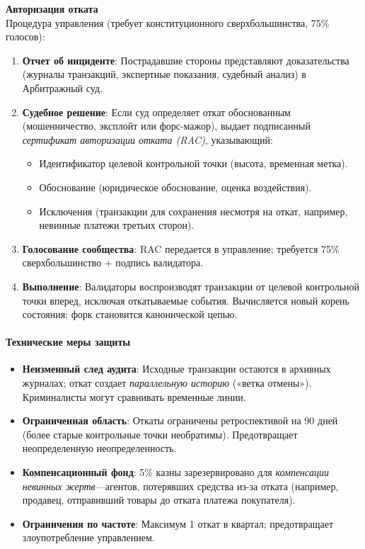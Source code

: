 \documentclass[11pt]{article}
\begin{document}
\textbf{Авторизация отката}\\
Процедура управления (требует конституционного сверхбольшинства, 75\% голосов):
\begin{enumerate}[noitemsep]
  \item \textbf{Отчет об инциденте}: Пострадавшие стороны представляют доказательства (журналы транзакций, экспертные показания, судебный анализ) в Арбитражный суд.
  \item \textbf{Судебное решение}: Если суд определяет откат обоснованным (мошенничество, эксплойт или форс-мажор), выдает подписанный \emph{сертификат авторизации отката (RAC)}, указывающий:
    \begin{itemize}[noitemsep]
      \item Идентификатор целевой контрольной точки (высота, временная метка).
      \item Обоснование (юридическое обоснование, оценка воздействия).
      \item Исключения (транзакции для сохранения несмотря на откат, например, невинные платежи третьих сторон).
    \end{itemize}
  \item \textbf{Голосование сообщества}: RAC передается в управление; требуется 75\% сверхбольшинство + подпись валидатора.
  \item \textbf{Выполнение}: Валидаторы воспроизводят транзакции от целевой контрольной точки вперед, исключая откатываемые события. Вычисляется новый корень состояния; форк становится канонической цепью.
\end{enumerate}

\paragraph{Технические меры защиты}
\begin{itemize}[noitemsep]
  \item \textbf{Неизменный след аудита}: Исходные транзакции остаются в архивных журналах; откат создает \emph{параллельную историю} («ветка отмены»). Криминалисты могут сравнивать временные линии.
  \item \textbf{Ограниченная область}: Откаты ограничены ретроспективой на 90 дней (более старые контрольные точки необратимы). Предотвращает неопределенную неопределенность.
  \item \textbf{Компенсационный фонд}: 5\% казны зарезервировано для \emph{компенсации невинных жертв}—агентов, потерявших средства из-за отката (например, продавец, отправивший товары до отката платежа покупателя).
  \item \textbf{Ограничения по частоте}: Максимум 1 откат в квартал; предотвращает злоупотребление управлением.
\end{itemize}
\end{document}
